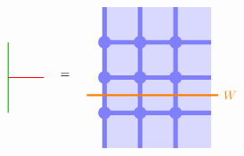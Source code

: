 \documentclass[report,paper=a4, fontsize=12pt, line_length=16cm, number_of_lines=33,dvipdfmx]{jlreq}
\numberwithin{equation}{chapter}
\begin{document}
\begin{align}
    \begin{tikzpicture}[baseline=0]
        \draw[darkgreen,thick] (0,1)--(0,-1);
        \draw[red,thick] (1,0)--(0,0);
    \end{tikzpicture}
    \quad
    =\quad
    \begin{tikzpicture}[baseline=0cm]
        \foreach \x in {0,1,2}{
            \foreach \y in {-2,-1,...,1}{
            \fill[plaqblue](\x,\y) rectangle (\x+1,\y+1);
            }
        }
        \foreach \x in {0,1,2}{
            \foreach \y in {-1,0,1}{
                \fill[linkblue] (\x,\y) circle (1.8mm);
            }
        }
        \foreach \x in {0,1,2}{
            \foreach \y in {-1,0,1}{
                \draw[linkblue, line width = 1.3mm](\x,\y)--(\x + 1,\y);
            }
        }
        \foreach \x in {0,1,2}{
            \foreach \y in {-2,-1,...,1}{
                \draw[linkblue, line width = 1.3mm](\x,\y)--(\x,\y + 1);
            }
        }
        \draw[red!50!yellow, ultra thick](-0.5,-0.5)--(3.2,-0.5) node[right]{$W$};
    \end{tikzpicture}        
\end{align}
\end{document}
